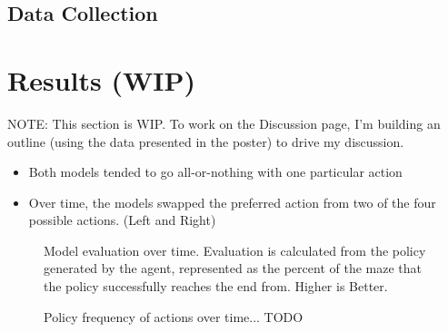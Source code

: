 \documentclass[12pt]{article}
\begin{document}
\subsection{Data Collection}


\section{Results (WIP)}


NOTE: This section is WIP. To work on the Discussion page, I'm building an outline (using the data presented in the poster) to drive my discussion.

\begin{itemize}
	\item Both models tended to go all-or-nothing with one particular action
	\item Over time, the models swapped the preferred action from two of the four possible actions. (Left and Right)
\end{itemize}




\begin{figure}[h]
	
    \caption{Model evaluation over time. Evaluation is calculated from the policy generated by the agent, represented as the percent of the maze that the policy successfully reaches the end from. Higher is Better.}
		\label{fig:evaluation}
\end{figure}

\begin{figure}[h]
	
	\caption{Policy frequency of actions over time... TODO}
	\label{fig:directional}
\end{figure}
\end{document}
